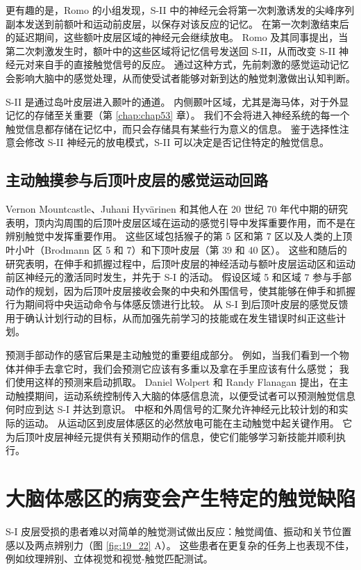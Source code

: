 更有趣的是，Romo 的小组发现，S-II 中的神经元会将第一次刺激诱发的尖峰序列副本发送到前额叶和运动前皮层，以保存对该反应的记忆。 
在第一次刺激结束后的延迟期间，这些额叶皮层区域的神经元会继续放电。 
Romo 及其同事提出，当第二次刺激发生时，额叶中的这些区域将记忆信号发送回 S-II，从而改变 S-II 神经元对来自手的直接触觉信号的反应。 
通过这种方式，先前刺激的感觉运动记忆会影响大脑中的感觉处理，从而使受试者能够对新到达的触觉刺激做出认知判断。


S-II 是通过岛叶皮层进入颞叶的通道。 
内侧颞叶区域，尤其是海马体，对于外显记忆的存储至关重要（第 \ref{chap:chap53} 章）。 
我们不会将进入神经系统的每一个触觉信息都存储在记忆中，而只会存储具有某些行为意义的信息。 
鉴于选择性注意会修改 S-II 神经元的放电模式，S-II 可以决定是否记住特定的触觉信息。


\subsection{主动触摸参与后顶叶皮层的感觉运动回路}
Vernon Mountcastle、Juhani Hyvärinen 和其他人在 20 世纪 70 年代中期的研究表明，顶内沟周围的后顶叶皮层区域在运动的感觉引导中发挥重要作用，而不是在辨别触觉中发挥重要作用。 
这些区域包括猴子的第 5 区和第 7 区以及人类的上顶叶小叶（Brodmann 区 5 和 7）和下顶叶皮层（第 39 和 40 区）。 
这些和随后的研究表明，在伸手和抓握过程中，后顶叶皮层的神经活动与额叶皮层运动区和运动前区神经元的激活同时发生，并先于 S-I 的活动。 
假设区域 5 和区域 7 参与手部动作的规划，因为后顶叶皮层接收会聚的中央和外围信号，使其能够在伸手和抓握行为期间将中央运动命令与体感反馈进行比较。 
从 S-I 到后顶叶皮层的感觉反馈用于确认计划行动的目标，从而加强先前学习的技能或在发生错误时纠正这些计划。


预测手部动作的感官后果是主动触觉的重要组成部分。 
例如，当我们看到一个物体并伸手去拿它时，我们会预测它应该有多重以及拿在手里应该有什么感觉； 我们使用这样的预测来启动抓取。 
Daniel Wolpert 和 Randy Flanagan 提出，在主动触摸期间，运动系统控制传入大脑的体感信息流，以便受试者可以预测触觉信息何时应到达 S-I 并达到意识。 
中枢和外周信号的汇聚允许神经元比较计划的和实际的运动。 
从运动区到皮层体感区的必然放电可能在主动触觉中起关键作用。 
它为后顶叶皮层神经元提供有关预期动作的信息，使它们能够学习新技能并顺利执行。



\section{大脑体感区的病变会产生特定的触觉缺陷}

S-I 皮层受损的患者难以对简单的触觉测试做出反应：触觉阈值、振动和关节位置感以及两点辨别力（图 \ref{fig:19_22} A）。 
这些患者在更复杂的任务上也表现不佳，例如纹理辨别、立体视觉和视觉-触觉匹配测试。

